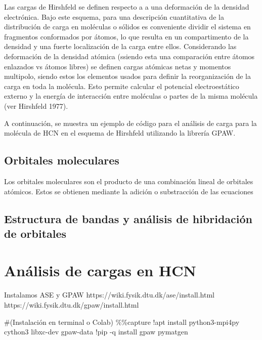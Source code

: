 \documentclass[
  letterpaper,
  DIV=11,
  numbers=noendperiod]{scrreprt}
\newenvironment{Shaded}{\begin{snugshade}}{\end{snugshade}}
\newcommand{\CommentTok}[1]{\textcolor[rgb]{0.37,0.37,0.37}{#1}}
\newcommand{\NormalTok}[1]{\textcolor[rgb]{0.00,0.23,0.31}{#1}}
\newcommand{\OperatorTok}[1]{\textcolor[rgb]{0.37,0.37,0.37}{#1}}
\begin{document}
Las cargas de Hirshfeld se definen respecto a a una deformación de la
densidad electrónica. Bajo este esquema, para una descripción
cuantitativa de la distribución de carga en moléculas o sólidos es
conveniente dividir el sistema en fragmentos conformados por átomos, lo
que resulta en un compartimento de la densidad y una fuerte localización
de la carga entre ellos. Considerando las deformación de la densidad
atómica (ssiendo esta una comparación entre átomos enlazados vs átomos
libres) se definen cargas atómicas netas y momentos multipolo, siendo
estos los elementos usados para definir la reorganización de la carga en
toda la molécula. Esto permite calcular el potencial electroestático
externo y la energía de interacción entre moléculas o partes de la misma
molécula (ver Hirshfeld 1977).

A continuación, se muestra un ejemplo de código para el análisis de
carga para la molécula de HCN en el esquema de Hirshfeld utilizando la
librería GPAW.

\hypertarget{orbitales-moleculares}{%
\section*{Orbitales moleculares}\label{orbitales-moleculares}}

Los orbitales moleculares son el producto de una combinación lineal de
orbitales atómicos. Estos se obtienen mediante la adición o substracción
de las ecuaciones

\hypertarget{estructura-de-bandas-y-anuxe1lisis-de-hibridaciuxf3n-de-orbitales}{%
\section*{Estructura de bandas y análisis de hibridación de
orbitales}\label{estructura-de-bandas-y-anuxe1lisis-de-hibridaciuxf3n-de-orbitales}}

\hypertarget{anuxe1lisis-de-cargas-en-hcn}{%
\chapter{Análisis de cargas en HCN}\label{anuxe1lisis-de-cargas-en-hcn}}

Instalamos ASE y GPAW https://wiki.fysik.dtu.dk/ase/install.html
https://wiki.fysik.dtu.dk/gpaw/install.html

\begin{Shaded}
\begin{Highlighting}[]
\CommentTok{\#(Instalación en terminal o Colab)}
\OperatorTok{\%\%}\NormalTok{capture}
\OperatorTok{!}\NormalTok{apt install python3}\OperatorTok{{-}}\NormalTok{mpi4py cython3 libxc}\OperatorTok{{-}}\NormalTok{dev gpaw}\OperatorTok{{-}}\NormalTok{data}
\OperatorTok{!}\NormalTok{pip }\OperatorTok{{-}}\NormalTok{q install gpaw pymatgen}
\end{Highlighting}
\end{Shaded}
\end{document}
